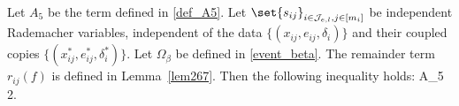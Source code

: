 \documentclass[twoside,11pt]{article}
\begin{document}
\begin{lemma}[Bound of  $A_5$]
\label{lem_a5}
    Let $A_5$ be the term defined in \eqref{def_A5}. Let $\set{s_{ij}}_{i \in \mathcal{J}_{e,l},j\in[m_{i}]}$ be independent Rademacher variables, independent of the data $\{(x_{ij}, e_{ij}, \delta_i)\}$ and their coupled copies $\{(x_{ij}^*, e_{ij}^*, \delta_i^*)\}$. Let $\Omega_\beta$ be defined in \eqref{event_beta}. The remainder term $r_{ij}(f)$ is defined in Lemma~\ref{lem267}. Then the following inequality holds:
\bea
A_5 \,\le\, 2.
    \bea
\end{lemma}
\end{document}
